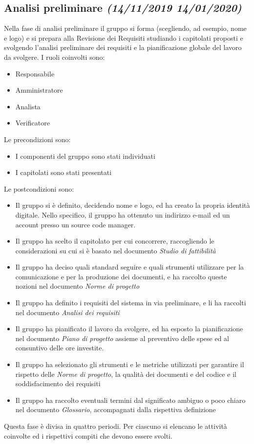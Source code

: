 \documentclass[../piano-di-progetto.tex]{subfiles}
\begin{document}
\subsection[Analisi preliminare]{Analisi preliminare {\normalsize\normalfont\itshape(14/11/2019  14/01/2020)}}%
\label{sub:analisi_preliminare}
Nella fase di analisi preliminare il gruppo si forma (scegliendo, ad esempio, nome e logo) e si prepara alla Revisione dei Requisiti studiando i capitolati proposti e svolgendo l'analisi preliminare dei requisiti e la pianificazione globale del lavoro da svolgere.
I ruoli coinvolti sono:
\begin{itemize}
  \item Responsabile
  \item Amministratore
  \item Analista
  \item Verificatore
\end{itemize}
Le precondizioni sono:
\begin{itemize}
  \item I componenti del gruppo sono stati individuati
  \item I capitolati sono stati presentati
\end{itemize}
Le postcondizioni sono:
\begin{itemize}
  \item Il gruppo si è definito, decidendo nome e logo, ed ha creato la propria identità digitale. Nello specifico, il gruppo ha ottenuto un indirizzo e-mail ed un account presso un source code manager.
  \item Il gruppo ha scelto il capitolato per cui concorrere, raccogliendo le considerazioni su cui si è basato nel documento \textit{Studio di fattibilità}
  \item Il gruppo ha deciso quali standard seguire e quali strumenti utilizzare per la comunicazione e per la produzione dei documenti, e ha raccolto queste nozioni nel documento \textit{Norme di progetto}
  \item Il gruppo ha definito i requisiti del sistema in via preliminare, e li ha raccolti nel documento \textit{Analisi dei requisiti}
  \item Il gruppo ha pianificato il lavoro da svolgere, ed ha esposto la pianificazione nel documento \textit{Piano di progetto} assieme al preventivo delle spese ed al consuntivo delle ore investite.
  \item Il gruppo ha selezionato gli strumenti e le metriche utilizzati per garantire il rispetto delle \textit{Norme di progetto}, la qualità dei documenti e del codice e il soddisfacimento dei requisiti
  \item Il gruppo ha raccolto eventuali termini dal significato ambiguo o poco chiaro nel documento \textit{Glossario}, accompagnati dalla rispettiva definizione
\end{itemize}
Questa fase è divisa in quattro periodi.
Per ciascuno si elencano le attività coinvolte ed i rispettivi compiti che devono essere svolti.
\end{document}
